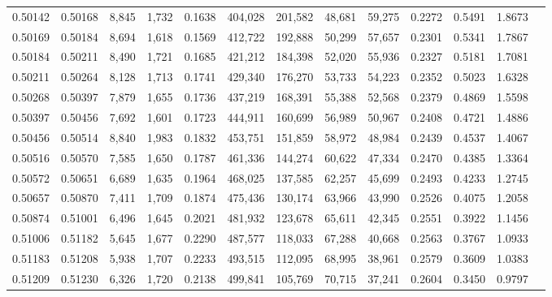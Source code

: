 \begin{tabular}{rrrrrrrrrrrrr}
0.50142 & 0.50168 &  8,845 & 1,732 &                                     0.1638 & 404,028 & 201,582 &  48,681 &  59,275 & 0.2272 & 0.5491 & 1.8673 \\
0.50169 & 0.50184 &  8,694 & 1,618 &                                     0.1569 & 412,722 & 192,888 &  50,299 &  57,657 & 0.2301 & 0.5341 & 1.7867 \\
0.50184 & 0.50211 &  8,490 & 1,721 &                                     0.1685 & 421,212 & 184,398 &  52,020 &  55,936 & 0.2327 & 0.5181 & 1.7081 \\
0.50211 & 0.50264 &  8,128 & 1,713 &                                     0.1741 & 429,340 & 176,270 &  53,733 &  54,223 & 0.2352 & 0.5023 & 1.6328 \\
0.50268 & 0.50397 &  7,879 & 1,655 &                                     0.1736 & 437,219 & 168,391 &  55,388 &  52,568 & 0.2379 & 0.4869 & 1.5598 \\
0.50397 & 0.50456 &  7,692 & 1,601 &                                     0.1723 & 444,911 & 160,699 &  56,989 &  50,967 & 0.2408 & 0.4721 & 1.4886 \\
0.50456 & 0.50514 &  8,840 & 1,983 &                                     0.1832 & 453,751 & 151,859 &  58,972 &  48,984 & 0.2439 & 0.4537 & 1.4067 \\
0.50516 & 0.50570 &  7,585 & 1,650 &                                     0.1787 & 461,336 & 144,274 &  60,622 &  47,334 & 0.2470 & 0.4385 & 1.3364 \\
0.50572 & 0.50651 &  6,689 & 1,635 &                                     0.1964 & 468,025 & 137,585 &  62,257 &  45,699 & 0.2493 & 0.4233 & 1.2745 \\
0.50657 & 0.50870 &  7,411 & 1,709 &                                     0.1874 & 475,436 & 130,174 &  63,966 &  43,990 & 0.2526 & 0.4075 & 1.2058 \\
0.50874 & 0.51001 &  6,496 & 1,645 &                                     0.2021 & 481,932 & 123,678 &  65,611 &  42,345 & 0.2551 & 0.3922 & 1.1456 \\
0.51006 & 0.51182 &  5,645 & 1,677 &                                     0.2290 & 487,577 & 118,033 &  67,288 &  40,668 & 0.2563 & 0.3767 & 1.0933 \\
0.51183 & 0.51208 &  5,938 & 1,707 &                                     0.2233 & 493,515 & 112,095 &  68,995 &  38,961 & 0.2579 & 0.3609 & 1.0383 \\
0.51209 & 0.51230 &  6,326 & 1,720 &                                     0.2138 & 499,841 & 105,769 &  70,715 &  37,241 & 0.2604 & 0.3450 & 0.9797 \\

\end{tabular}
